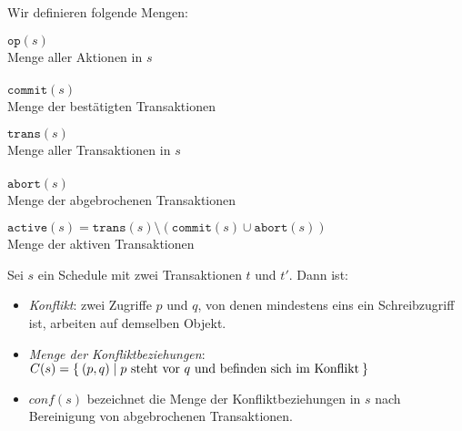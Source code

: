 \documentclass[a4paper,parskip=half*,DIV=15,fontsize=11pt]{scrartcl}
\begin{document}
Wir definieren folgende Mengen:

\begin{minipage}[t]{0.5\textwidth}
\begin{center}
$\texttt{op}(s)$ \\
Menge aller Aktionen in $s$ \\
\ \\
$\texttt{commit}(s)$ \\
Menge der bestätigten Transaktionen \\
\end{center}
\end{minipage}
\begin{minipage}[t]{0.5\textwidth}
\begin{center}
$\texttt{trans}(s)$ \\
Menge aller Transaktionen in $s$ \\
\ \\
$\texttt{abort}(s)$ \\
Menge der abgebrochenen Transaktionen \\
\end{center}
\end{minipage}
\begin{center}
$\texttt{active}(s) = \texttt{trans}(s) \setminus (\texttt{commit}(s) \cup \texttt{abort}(s))$ \\
Menge der aktiven Transaktionen
\end{center}

Sei $s$ ein Schedule mit zwei Transaktionen $t$ und $t'$. Dann ist:
\begin{itemize}
\item \emph{Konflikt}: zwei Zugriffe $p$ und $q$, von denen mindestens eins ein Schreibzugriff ist, arbeiten auf demselben Objekt.
\item \emph{Menge der Konfliktbeziehungen}: $C(s) = \Set{(p,q)|p \textrm{ steht vor } q \textrm{ und befinden sich im Konflikt}}$
\item $conf(s)$ bezeichnet die Menge der Konfliktbeziehungen in $s$ nach Bereinigung von abgebrochenen Transaktionen.
\end{itemize}
\end{document}
